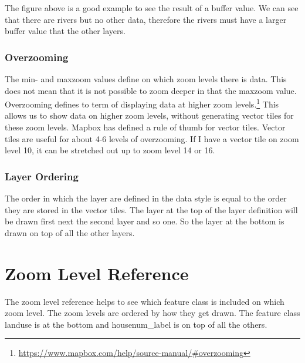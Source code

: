 The figure above is a good example to see the result of a buffer value. We can see that there are rivers but no other data, therefore the rivers must have a larger buffer value that the other layers.

\subsubsection{Overzooming}\label{overzooming}
The min- and maxzoom values define on which zoom levels there is data. This does not mean that it is not possible to zoom deeper in that the maxzoom value.
Overzooming defines to term of displaying data at higher zoom levels.\footnote{\url{https://www.mapbox.com/help/source-manual/#overzooming}}
This allows us to show data on higher zoom levels, without generating vector tiles for these zoom levels.
Mapbox has defined a rule of thumb for vector tiles. Vector tiles are useful for about 4-6 levels of overzooming. If I have a vector tile on zoom level 10, it can be stretched out up to zoom level 14 or 16.  

\subsubsection{Layer Ordering}\label{layer_ordering}
The order in which the layer are defined in the data style is equal to the order they are stored in the vector tiles.
The layer at the top of the layer definition will be drawn first next the second layer and so one. So the layer at the bottom is drawn on top of all the other layers. 


\section{Zoom Level Reference}\label{zoomlevel_reference}
The zoom level reference helps to see which feature class is included on which zoom level. The zoom levels are ordered by how they get drawn. The feature class landuse is at the bottom and housenum_label is on top of all the others. 


